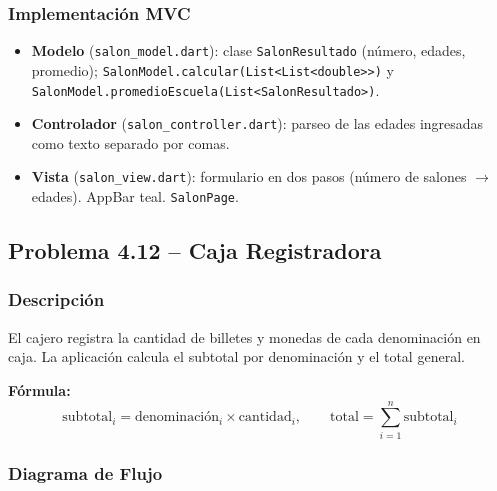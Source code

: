 \documentclass[12pt,a4paper]{article}
\begin{document}
\subsubsection{Implementación MVC}

\begin{itemize}
  \item \textbf{Modelo} (\texttt{salon\_model.dart}): clase \texttt{SalonResultado} (número, edades, promedio); \texttt{SalonModel\allowbreak.calcular\allowbreak(List<List<double>>)} y \texttt{SalonModel\allowbreak.promedioEscuela\allowbreak(List<\allowbreak{}SalonResultado>)}.
  \item \textbf{Controlador} (\texttt{salon\_controller.dart}): parseo de las edades ingresadas como texto separado por comas.
  \item \textbf{Vista} (\texttt{salon\_view.dart}): formulario en dos pasos (número de salones $\rightarrow$ edades). AppBar teal. \texttt{SalonPage}.
\end{itemize}

\subsection{Problema 4.12 -- Caja Registradora}

\subsubsection{Descripción}

El cajero registra la cantidad de billetes y monedas de cada denominación en caja. La aplicación calcula el subtotal por denominación y el total general.

\textbf{Fórmula:}
\[
  \text{subtotal}_i = \text{denominación}_i \times \text{cantidad}_i, \qquad
  \text{total} = \sum_{i=1}^{n} \text{subtotal}_i
\]

\subsubsection{Diagrama de Flujo}
\end{document}
